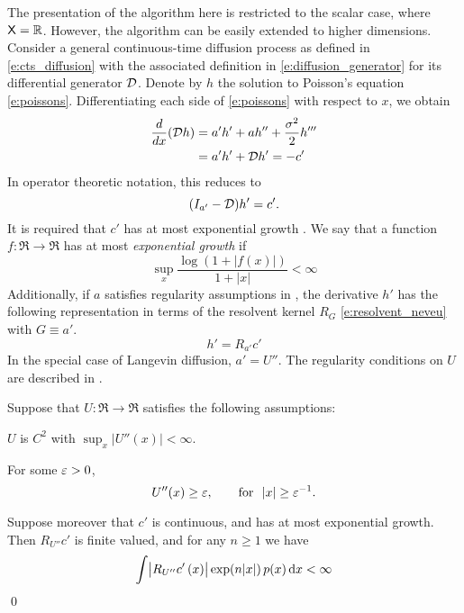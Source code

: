 The presentation of the algorithm here is restricted to the scalar case, where ${\sf X} = \mathbb{R}$. However, the algorithm can be easily extended to higher dimensions.   Consider a general continuous-time diffusion process as defined in \eqref{e:cts_diffusion} with the associated definition in \eqref{e:diffusion_generator} for its differential generator ${\cal D}$. Denote by $h$ the solution to Poisson's equation \eqref{e:poissons}.  Differentiating each side of \eqref{e:poissons} with respect to $x$, we obtain
\[
\begin{aligned}
\frac{d}{dx} ({\cal D} h) & = a'h' + ah'' + \frac{\sigma^2}{2} h''' \\
&  = 	a'h' + {\cal D} h'  = -c'
\end{aligned}
\]
In operator theoretic notation, this reduces to
\[
(I_{a'} - {\cal D})h' = c'.
\]
It is required that $c'$ has at most exponential growth \cite{devkonmey17b}. We say that a function $f\colon\Re\to\Re$ has at most \textit{exponential growth} if
\[
\sup_x  \frac{ \log(1+|f(x)|)}{1+|x|}  <\infty
\]
Additionally, if $a$ satisfies regularity assumptions in , the derivative $h'$ has the following representation in terms of the resolvent kernel $R_G$ \eqref{e:resolvent_neveu} with $G \equiv a'$. 
\[
h' = R_{a'} c'
\]
In the special case of Langevin diffusion, $a' = U''$. The regularity conditions on $U$ are described in .
\begin{proposition}
	\label{prop:regularity_U}
	Suppose that $U\colon\Re\to\Re$ satisfies the following assumptions:
	\begin{romannum}
		\item $U$ is $C^2$ with $\sup_x |U''(x)| <\infty$.
		\item  For some $\varepsilon>0$,
		\[
		U''(x) \ge \varepsilon,\qquad \text{for} \ \ |x|\ge \varepsilon^{-1}.
		\]
	\end{romannum}
	Suppose moreover that $c'$ is continuous, and has at most exponential growth.
	Then $ R_{U''} c'$ is finite valued, and for any $n\ge 1$ we have
	\[
	\int   \bigl|  R_{U''} c'\, (x) \bigr|\exp(n |x|)  \, p(x) \,\textmd{d} x  <\infty
	\]
	\qed
\end{proposition}

